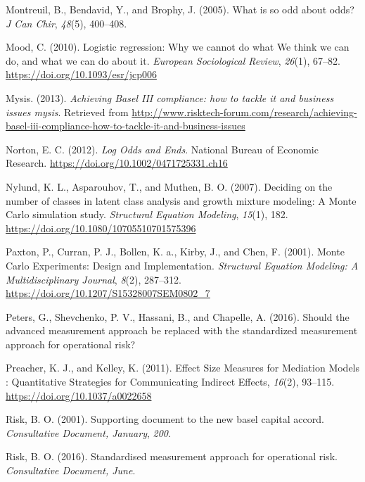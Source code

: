 \documentclass[]{DissertateUSU}
\begin{document}
\hypertarget{ref-Montreuil2005}{}
Montreuil, B., Bendavid, Y., and Brophy, J. (2005). What is so odd about
odds? \emph{J Can Chir}, \emph{48}(5), 400--408.

\hypertarget{ref-Mood2010}{}
Mood, C. (2010). Logistic regression: Why we cannot do what We think we
can do, and what we can do about it. \emph{European Sociological
Review}, \emph{26}(1), 67--82. \url{https://doi.org/10.1093/esr/jcp006}

\hypertarget{ref-mysis2013}{}
Mysis. (2013). \emph{Achieving Basel III compliance: how to tackle it
and business issues mysis}. Retrieved from
\url{http://www.risktech-forum.com/research/achieving-basel-iii-compliance-how-to-tackle-it-and-business-issues}

\hypertarget{ref-Norton2012}{}
Norton, E. C. (2012). \emph{Log Odds and Ends}. National Bureau of
Economic Research. \url{https://doi.org/10.1002/0471725331.ch16}

\hypertarget{ref-Nylund2007}{}
Nylund, K. L., Asparouhov, T., and Muthen, B. O. (2007). Deciding on the
number of classes in latent class analysis and growth mixture modeling:
A Monte Carlo simulation study. \emph{Structural Equation Modeling},
\emph{15}(1), 182. \url{https://doi.org/10.1080/10705510701575396}

\hypertarget{ref-Paxton2001}{}
Paxton, P., Curran, P. J., Bollen, K. a., Kirby, J., and Chen, F.
(2001). Monte Carlo Experiments: Design and Implementation.
\emph{Structural Equation Modeling: A Multidisciplinary Journal},
\emph{8}(2), 287--312. \url{https://doi.org/10.1207/S15328007SEM0802_7}

\hypertarget{ref-peters2016should}{}
Peters, G., Shevchenko, P. V., Hassani, B., and Chapelle, A. (2016).
Should the advanced measurement approach be replaced with the
standardized measurement approach for operational risk?

\hypertarget{ref-Preacher2011}{}
Preacher, K. J., and Kelley, K. (2011). Effect Size Measures for
Mediation Models : Quantitative Strategies for Communicating Indirect
Effects, \emph{16}(2), 93--115. \url{https://doi.org/10.1037/a0022658}

\hypertarget{ref-risk2001supporting}{}
Risk, B. O. (2001). Supporting document to the new basel capital accord.
\emph{Consultative Document, January}, \emph{200}.

\hypertarget{ref-risk2016supporting}{}
Risk, B. O. (2016). Standardised measurement approach for operational
risk. \emph{Consultative Document, June}.
\end{document}
